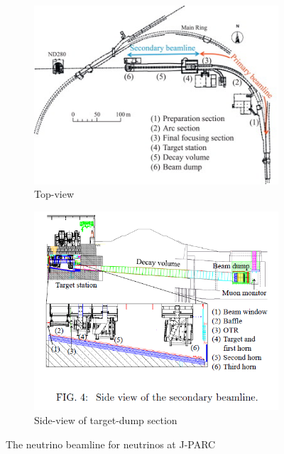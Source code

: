\begin{figure}[h]
	\begin{subfigure}[t]{0.4\textwidth}
		\includegraphics[width=\textwidth, trim={0mm 0mm 0mm 0mm}, clip,page=1]{figures/det_chap/beam/beam.jpg}
		\caption{Top-view}
	\end{subfigure}
	\begin{subfigure}[t]{0.4\textwidth}
		\includegraphics[width=\textwidth, trim={0mm 18mm 0mm 0mm}, clip,page=1]{figures/det_chap/beam/sideview_beam}
		\caption{Side-view of target-dump section}
	\end{subfigure}
	\caption{The neutrino beamline for neutrinos at J-PARC}
	\label{fig:neutrino_beamline}
\end{figure}


